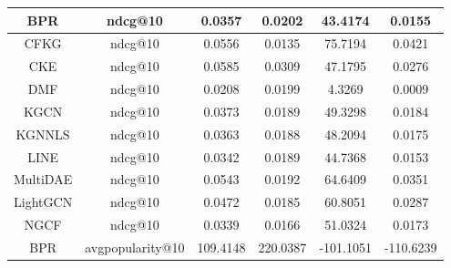 \begin{table}[H]
{\begin{tabular}{|c|c|c|c|c|c|}
    BPR              & ndcg@10           & 0.0357                        & 0.0202                          & 43.4174                               & 0.0155                                \\ \hline
    CFKG             & ndcg@10           & 0.0556                        & 0.0135                          & 75.7194                               & 0.0421                                \\ \hline
    CKE              & ndcg@10           & 0.0585                        & 0.0309                          & 47.1795                               & 0.0276                                \\ \hline
    DMF              & ndcg@10           & 0.0208                        & 0.0199                          & 4.3269                                & 0.0009                                \\ \hline
    KGCN             & ndcg@10           & 0.0373                        & 0.0189                          & 49.3298                               & 0.0184                                \\ \hline
    KGNNLS           & ndcg@10           & 0.0363                        & 0.0188                          & 48.2094                               & 0.0175                                \\ \hline
    LINE             & ndcg@10           & 0.0342                        & 0.0189                          & 44.7368                               & 0.0153                                \\ \hline
    MultiDAE         & ndcg@10           & 0.0543                        & 0.0192                          & 64.6409                               & 0.0351                                \\ \hline
    LightGCN         & ndcg@10           & 0.0472                        & 0.0185                          & 60.8051                               & 0.0287                                \\ \hline
    NGCF             & ndcg@10           & 0.0339                        & 0.0166                          & 51.0324                               & 0.0173                                \\ \hline
    BPR              & avgpopularity@10 & 109.4148                      & 220.0387                        & -101.1051                              & -110.6239                             \\ \hline

\end{tabular}}
\end{table}
